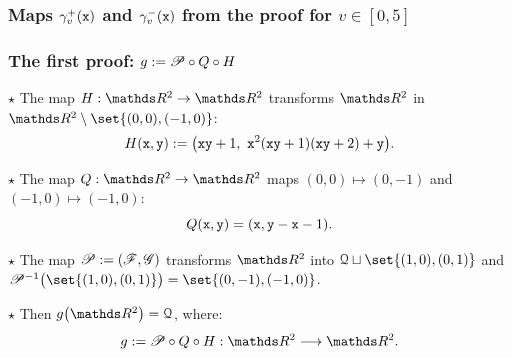 \documentclass{beamer}
\begin{document}
\begin{frame}
\frametitle{Maps $\gamma_v^+(\x)$ and $\gamma_v^-(\x)$ from the proof for $v\in[0,5]$}
\vspace{-0.3cm}
\begin{center}
\begin{animateinline}[autoplay,totalheight=8cm,loop]{12}
	\newframe*
\end{animateinline}
\end{center}
\end{frame}

\begin{frame}
\frametitle{The first proof: $g:=\P\circ Q\circ H$} 
$\star$ The map $H:\R^2\to\R^2$ transforms $\R^2$ in $\R^2\setminus \set{(0,0),(-1,0)}$:
$$
H(\x,\y) := \big(\x\y+1,\ \x^2(\x\y+1)(\x\y+2)+\y\big).
$$
\vspace{0.01cm}

$\star$ The map $Q:\R^2\to\R^2$ maps $(0,0) \mapsto (0,-1)$ and $(-1,0) \mapsto (-1,0)$: 
$$
Q(\x,\y)= (\x,\y-\x-1).
$$
\vspace{0.01cm}

$\star$ The map $\P := (\F, \G)$ transforms $\R^2$ into $\Qu \sqcup \set{(1,0),(0,1)}$ and $\P^{-1}\big(\set{(1,0),(0,1)}\big) = \set{(0,-1),(-1,0)}$.
\vspace{0.5cm}

$\star$ Then $g\big(\R^2\big) = \Qu$, where:
$$
g:=\P\circ Q\circ H:\R^2\longrightarrow\R^2.
$$
\end{frame}
\end{document}
